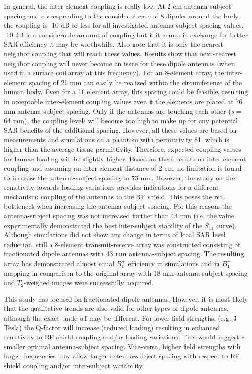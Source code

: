 \documentclass[fleqn,10pt]{wlscirep}
\begin{document}
In general, the inter-element coupling is really low. At 2 cm antenna-subject spacing and corresponding to the considered case of 8 dipoles around the body, the coupling is -10 dB or less for all investigated antenna-subject spacing values. -10 dB is a considerable amount of coupling but if it comes in exchange for better SAR efficiency it may be worthwhile. Also note that it is only the nearest-neighbor coupling that will reach these values. Results show that next-nearest neighbor coupling will never become an issue for these dipole antennas (when used in a surface coil array at this frequency). For an 8-element array, the inter-element spacing of 20 mm can easily be realized within the circumference of the human body. Even for a 16 element array, this spacing could be feasible, resulting in acceptable inter-element coupling values even if the elements are placed at 76 mm antenna-subject spacing. Only if the antennas are touching each other ($s=$64 mm), the coupling levels will become too high to make up for any potential SAR benefits of the additional spacing. However, all these values are based on measurements and simulations on a phantom with permittivity 81, which is higher than the average tissue permittivity. Therefore, expected coupling values for human loading will be slightly higher. Based on these results on inter-element coupling and assuming an inter-element distance of 2 cm, no limitation is found to increase the antenna-subject spacing to 73 mm. However, the study on the sensitivity towards loading variations provides indications for a different mechanism: coupling of the antennas to the RF shield. This poses the real bottleneck when increasing the antenna-subject spacing. For this reason, the antenna-subject spacing was not increased further than 43 mm (i.e. the value experimentally demonstrated the best inter-subject stability of the $S_{11}$ curve).
Although simulations did not show any change in terms of local SAR level reduction, still a 8-element transmit-receive array was constructed consisting of fractionated dipole antennas with 43 mm antenna-subject spacing. The resulting array has demonstrated almost equal $B_1^{+}$ efficiency in simulations and in $B_1^{+}$ mapping in comparison to the original array with 18 mm antenna-subject spacing and $T_{2}$-weighed images were successfully acquired.

This study has focused on fractionated dipole antennas. However, it is most likely that the qualitative trends are also valid for other types of dipole antennas, although the exact trade-off may be different. For lower field strengths,  (e.g. 3 Tesla) the Q-factor will increase (reduced loading) resulting in enhanced sensitivity to RF shield coupling and/or loading variations. This would suggest a smaller optimal antenna-subject spacing. Vice-versa, higher field strengths with larger frequencies may allow larger antenna-subject spacing with respect to RF shield coupling and/or inter-subject variability.
\end{document}
